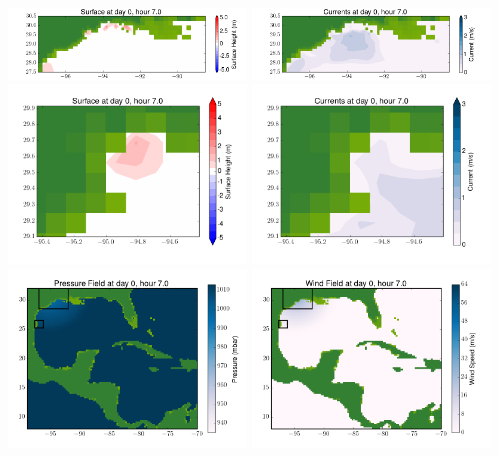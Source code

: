 \documentclass[11pt]{article}
\begin{document}
\includegraphics[width=0.475\textwidth]{frame0079fig4.png}
\vskip 10pt 
\includegraphics[width=0.475\textwidth]{frame0079fig5.png}
\includegraphics[width=0.475\textwidth]{frame0079fig6.png}
\vskip 10pt 
\includegraphics[width=0.475\textwidth]{frame0079fig7.png}
\includegraphics[width=0.475\textwidth]{frame0079fig8.png}
\vskip 10pt 
\includegraphics[width=0.475\textwidth]{frame0079fig9.png}
\end{document}
